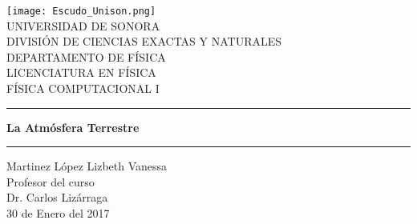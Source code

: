 \documentclass{article}
\begin{document}
\begin{center}
\texttt{[image: Escudo\_Unison.png]}
\\
\vspace{0.5cm}
UNIVERSIDAD DE SONORA \\
\vspace{0.5cm}
DIVISIÓN DE CIENCIAS EXACTAS Y NATURALES \\
\vspace{0.5cm}
DEPARTAMENTO DE FÍSICA\\
\vspace{0.5cm}
LICENCIATURA EN FÍSICA\\
\vspace{0.5cm}
FÍSICA COMPUTACIONAL I

\vspace{2 cm}
\hrule
\vspace{1 cm}

{\huge \bfseries {La Atmósfera Terrestre}}
\\

\vspace{1 cm}
\hrule
\vspace{2 cm}
Martinez López Lizbeth Vanessa \\ 
\vspace{1 cm}
Profesor del curso\\
Dr. Carlos Lizárraga\\
\vspace{2 cm}
30 de Enero del 2017
\end{center}
\end{document}
